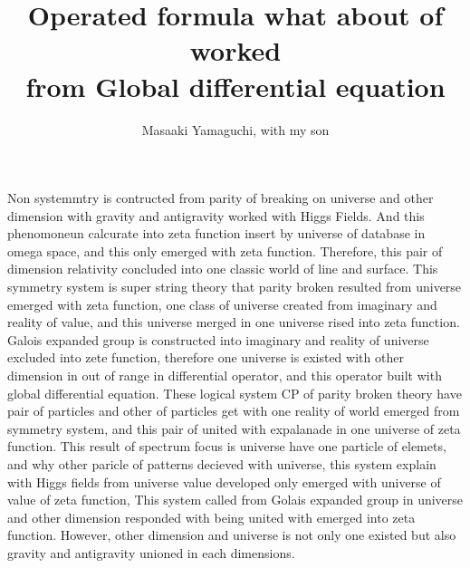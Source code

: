 \documentclass{jsarticle}
\begin{document}
\title{Operated formula what about of worked \\
from Global differential equation }
\author{Masaaki Yamaguchi, with my son}
\date{}
\maketitle

  Non systemmtry is contructed from parity of breaking on universe and
other dimension with gravity and antigravity worked with Higgs Fields.
And this phenomoneun calcurate into zeta function insert by universe of 
database in omega space, and this only emerged with zeta function.
Therefore, this pair of dimension relativity concluded into one classic
world of line and surface. This symmetry system is super string theory
that parity broken resulted from universe emerged with zeta function,
one class of universe created from imaginary and reality of value,
and this universe merged in one universe rised into zeta function.
Galois expanded group is constructed into imaginary and reality of universe
excluded into zete function, therefore one universe is existed with
other dimension in out of range in differential operator, and this operator
built with global differential equation.
These logical system CP of parity broken theory have pair of 
particles and other of particles get with one 
reality of world emerged from symmetry system,
and this pair of united with expalanade in one universe of zeta function.
This result of spectrum focus is universe have one particle of elemets,
and why other paricle of patterns decieved with universe,
this system explain with Higgs fields from universe value developed 
only emerged with universe of value of zeta function,
This system called from Golais expanded group in universe and 
other dimension responded with being united with emerged into zeta function.
However, other dimension and universe is not only one existed but also
gravity and antigravity unioned in each dimensions.
\end{document}

